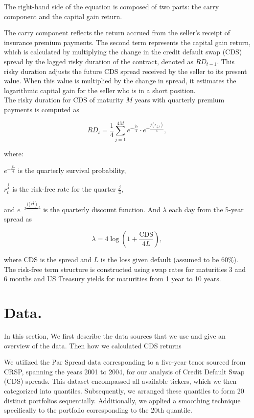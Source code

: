 \documentclass{article}
\begin{document}
\begin{Data science tools for finance final project}
\begin{equation}
\end{equation}

The right-hand side of the equation is composed of two parts: the carry component and the capital gain return. \

The carry component reflects the return accrued from the seller’s receipt of insurance premium payments. The second term represents the capital gain return, which is calculated by multiplying the change in the credit default swap (CDS) spread by the lagged risky duration of the contract, denoted as \( RD_{t-1} \). This risky duration adjusts the future CDS spread received by the seller to its present value. When this value is multiplied by the change in spread, it estimates the logarithmic capital gain for the seller who is in a short position.\\

The risky duration for CDS of maturity $M$ years with quarterly premium payments is computed as


\begin{equation}
RD_t = \frac{1}{4} \sum_{j=1}^{4M} e^{-\frac{j\lambda}{4}} \cdot e^{-\frac{j(r_{\frac{j}{4}, t})}{4}},
\end{equation}




where:\


$e^{-\frac{j\lambda}{4}}$ is the quarterly survival probability, \ 

$r^{\frac{j}{4}}_t$ is the risk-free rate for the quarter $\frac{j}{4}$,\

and $e^{-j\frac{j(r^{\frac{j}{4}})}_{4}}$ is the quarterly discount function. And  $\lambda$ each day from the 5-year spread as

\[
\lambda = 4 \log \left(1 + \frac{\text{CDS}}{4L}\right),
\]

where $\text{CDS}$ is the spread and $L$ is the loss given default (assumed to be 60\%). The risk-free term structure is constructed using swap rates for maturities 3 and 6 months and US Treasury yields for maturities from 1 year to 10 years.


\section{Data.}
In this section, We first describe the data sources that we use and give an overview of the data. Then how we calculated CDS returns


We utilized the Par Spread data corresponding to a five-year tenor sourced from CRSP, spanning the years 2001 to 2004, for our analysis of Credit Default Swap (CDS) spreads. This dataset encompassed all available tickers, which we then categorized into quantiles. Subsequently, we arranged these quantiles to form 20 distinct portfolios sequentially. Additionally, we applied a smoothing technique specifically to the portfolio corresponding to the 20th quantile. 


\end{Data science tools for finance final project}
\end{document}
